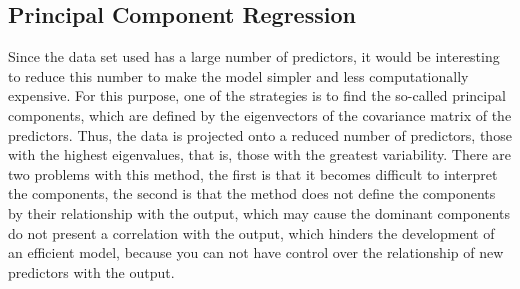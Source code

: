 \subsection{Principal Component Regression}
Since the data set used has a large number of predictors, it would be interesting to reduce this number to make the model simpler and less computationally expensive.
 For this purpose, one of the strategies is to find the so-called principal components, which are defined by the eigenvectors of the covariance matrix of the predictors. Thus, the data is projected onto a reduced number of predictors, those with the highest eigenvalues, that is, those with the greatest variability. There are two problems with this method, the first is that it becomes difficult to interpret the components, the second is that the method does not define the components by their relationship with the output, which may cause the dominant components do not present a correlation with the output, which hinders the development of an efficient model, because you can not have control over the relationship of new predictors with the output.

